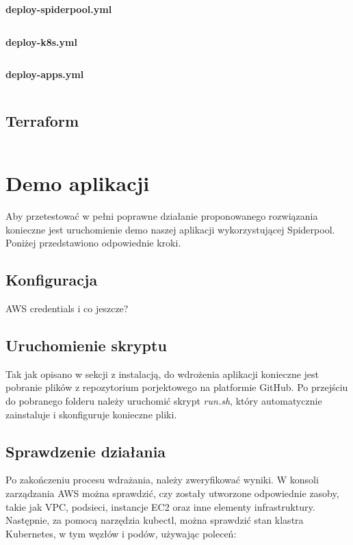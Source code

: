 \documentclass[onecolumn,12pt]{article}
\begin{document}
\textbf{deploy-spiderpool.yml}
\begin{lstlisting}[style=yaml]
\end{lstlisting}


\textbf{deploy-k8s.yml}
\begin{lstlisting}[style=yaml]
\end{lstlisting}


\textbf{deploy-apps.yml}
\begin{lstlisting}[style=yaml]
\end{lstlisting}


\subsection{Terraform}

\begin{lstlisting}[style=yaml]
\end{lstlisting}


\section{Demo aplikacji}
Aby przetestować w pełni poprawne działanie proponowanego rozwiązania konieczne jest uruchomienie
demo naszej aplikacji wykorzystującej Spiderpool. Poniżej przedstawiono odpowiednie kroki.

\subsection{Konfiguracja}

AWS credentials i co jeszcze?

\subsection{Uruchomienie skryptu}

Tak jak opisano w sekcji z instalacją, do wdrożenia aplikacji konieczne jest pobranie plików z 
repozytorium porjektowego na platformie GitHub. Po przejściu do pobranego folderu należy 
uruchomić skrypt \textit{run.sh}, który automatycznie zainstaluje i skonfiguruje konieczne pliki.

\subsection{Sprawdzenie działania}
Po zakończeniu procesu wdrażania, należy zweryfikować wyniki. W konsoli zarządzania AWS można
sprawdzić, czy zostały utworzone odpowiednie zasoby, takie jak VPC, podsieci, instancje EC2 oraz
inne elementy infrastruktury. Następnie, za pomocą narzędzia kubectl, można sprawdzić stan klastra
Kubernetes, w tym węzłów i podów, używając poleceń:
\end{document}
